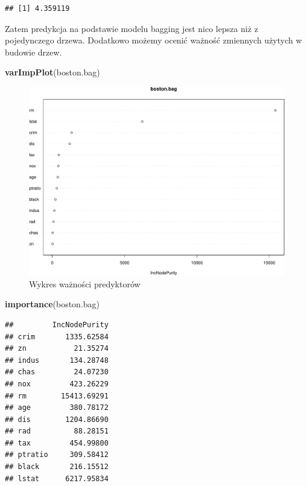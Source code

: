 \documentclass[
]{book}
\newenvironment{Shaded}{\begin{snugshade}}{\end{snugshade}}
\newcommand{\KeywordTok}[1]{\textcolor[rgb]{0.13,0.29,0.53}{\textbf{#1}}}
\newcommand{\NormalTok}[1]{#1}
\theoremstyle{plain}
\theoremstyle{definition}
\theoremstyle{definition}
\theoremstyle{definition}
\theoremstyle{definition}
\theoremstyle{remark}
\begin{document}
\begin{verbatim}
## [1] 4.359119
\end{verbatim}

Zatem predykcja na podstawie modelu bagging jest nico lepsza niż z pojedynczego drzewa. Dodatkowo możemy ocenić ważność zmiennych użytych w budowie drzew.

\begin{Shaded}
\begin{Highlighting}[]
\KeywordTok{varImpPlot}\NormalTok{(boston.bag)}
\end{Highlighting}
\end{Shaded}

\begin{figure}
\centering
\includegraphics{EksploracjaDanych_files/figure-latex/unnamed-chunk-38-1.pdf}
\caption{\label{fig:unnamed-chunk-38}Wykres ważności predyktorów}
\end{figure}

\begin{Shaded}
\begin{Highlighting}[]
\KeywordTok{importance}\NormalTok{(boston.bag)}
\end{Highlighting}
\end{Shaded}

\begin{verbatim}
##         IncNodePurity
## crim       1335.62584
## zn           21.35274
## indus       134.28748
## chas         24.07230
## nox         423.26229
## rm        15413.69291
## age         380.78172
## dis        1204.86690
## rad          88.28151
## tax         454.99800
## ptratio     309.58412
## black       216.15512
## lstat      6217.95834
\end{verbatim}
\end{document}

